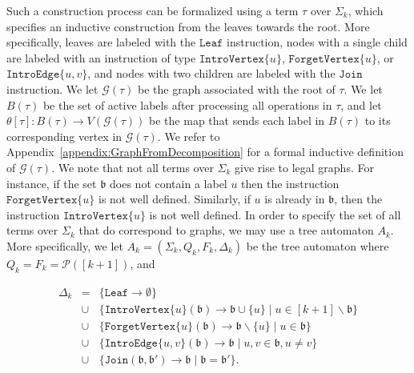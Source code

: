 \documentclass[11pt,a4paper]{article}
\newcommand{\treeautomaton}{A}
\newcommand{\statestreeautomaton}{Q}
\newcommand{\transitionstreeautomaton}{\Delta}
\newcommand{\finalstatestreeautomaton}{F}
\newcommand{\treewidthvalue}{k}
\newcommand{\alphabet}{\Sigma}
\newcommand{\decompositiongraph}[1]{\mathcal{G}(#1)}
\newcommand{\abag}{\mathfrak{b}}
\newcommand{\vertexset}[1]{V(#1)}
\newcommand{\introvertextype}[1]{\mathtt{IntroVertex}\{#1\}}
\newcommand{\introedgetype}[2]{\mathtt{IntroEdge}\{#1,#2\}}
\newcommand{\forgetvertextype}[1]{\mathtt{ForgetVertex}\{#1\}}
\newcommand{\jointype}{\mathtt{Join}}
\newcommand{\leaftype}{\mathtt{Leaf}}
\newcommand{\topbagname}{B}
\newcommand{\topbag}[1]{\topbagname(#1)}
\newcommand{\abstractdecomposition}{\tau}
\newcommand{\vertexone}{u}
\newcommand{\vertextwo}{v}
\newcommand{\abstractalphabet}[1]{\Sigma_{#1}}
\newcommand{\powerset}[1]{\mathcal{P}(#1)}
\newcommand{\topmapname}{\theta}
\newcommand{\topmap}[1]{\topmapname[#1]}
\begin{document}
Such a construction process can be formalized using a term $\abstractdecomposition$ over $\abstractalphabet{\treewidthvalue}$, which specifies an inductive construction from the leaves towards the root. More specifically, leaves are labeled with the  $\leaftype$ instruction, nodes with a single child are labeled with an instruction of type $\introvertextype{\vertexone}$,
$\forgetvertextype{\vertexone}$, or
$\introedgetype{\vertexone}{\vertextwo}$, and nodes with two children are labeled with the $\jointype$ instruction. We let $\decompositiongraph{\abstractdecomposition}$ be the graph associated with the root of $\abstractdecomposition$. We let $\topbag{\abstractdecomposition}$ be the set of active labels after processing all operations in $\abstractdecomposition$, and let
 $\topmap{\abstractdecomposition}:\topbag{\abstractdecomposition} \rightarrow \vertexset{\decompositiongraph{\abstractdecomposition}}$ be the map that sends each label in
$\topbag{\abstractdecomposition}$ to its corresponding vertex in $\decompositiongraph{\abstractdecomposition}$.
We refer to Appendix~\ref{appendix:GraphFromDecomposition} for a formal inductive definition of $\decompositiongraph{\abstractdecomposition}$.
 We note that not all terms
over $\abstractalphabet{\treewidthvalue}$ give rise to legal graphs. For instance, if the set $\abag$ does not contain a label $\vertexone$ then the instruction $\forgetvertextype{\vertexone}$ is not well defined. Similarly, if $\vertexone$ is already in $\abag$, then the instruction $\introvertextype{\vertexone}$ is not well defined. In order to specify the set of all terms over $\abstractalphabet{\treewidthvalue}$
that do correspond to graphs, we may use a tree automaton $\treeautomaton_{\treewidthvalue}$.
More specifically, we let $\treeautomaton_{\treewidthvalue} =  (\alphabet_k,\statestreeautomaton_k,\finalstatestreeautomaton_k,\transitionstreeautomaton_k)$ be the tree automaton where $\statestreeautomaton_k = \finalstatestreeautomaton_k = \powerset{[\treewidthvalue+1]}$, and

\[
\begin{array}{lcl}
\transitionstreeautomaton_k &=& \{ \leaftype \rightarrow \emptyset\}\;  \\
& \cup& \{\introvertextype{\vertexone}(\abag) \rightarrow \abag \cup \{\vertexone\} \;|\;  \vertexone\in [\treewidthvalue+1]\backslash \abag\} \\
&\cup& \{\forgetvertextype{\vertexone}(\abag) \rightarrow \abag\backslash \{\vertexone\} \;|\; \vertexone\in \abag\} \\
&\cup&\{\introedgetype{\vertexone}{\vertextwo}(\abag) \rightarrow \abag\;|\; \vertexone,\vertextwo\in \abag, \vertexone\neq \vertextwo\} \\
&\cup& \{\jointype(\abag,\abag')\rightarrow \abag \;|\; \abag = \abag'\}.
\end{array}
\]
\end{document}
